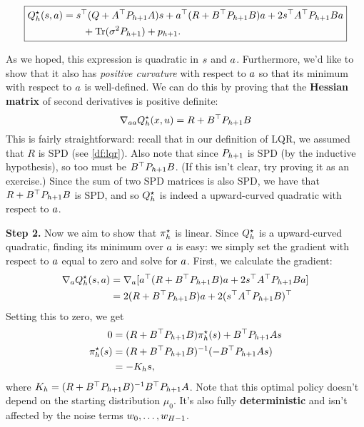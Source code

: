 \documentclass[\main/main]{subfiles}
\begin{document}
\begin{equation}
    \boxed{
        \begin{aligned}
            Q^\star_h(s, a) & = s^\top (Q + A^\top P_{h+1} A) s + a^\top (R + B^\top P_{h+1} B) a
            + 2s^\top A^\top P_{h+1} B a                                                                        \\
                                   & \qquad + \operatorname*{\textrm{Tr}}(\sigma^2 P_{h+1}) + p_{h+1}.
        \end{aligned}
    }
    \label{eq:q_star_lqr}
\end{equation}

As we hoped, this expression is quadratic in $s$ and $a$.
Furthermore, we'd like to show that it also has \emph{positive curvature} with respect to $a$ so that its minimum with respect to $a$ is well-defined.
We can do this by proving that the \textbf{Hessian matrix} of second derivatives is positive definite:
\[ \nabla_{a a} Q_h^\star(x, u) = R + B^\top P_{h+1} B \]
This is fairly straightforward:
recall that in our definition of LQR,
we assumed that $R$ is SPD (see \autoref{df:lqr}).
Also note that since $P_{h+1}$ is SPD (by the inductive hypothesis), so too must be $B^\top P_{h+1} B$. (If this isn't clear, try proving it as an exercise.)
Since the sum of two SPD matrices is also SPD, we have that $R + B^\top P_{h+1} B$ is SPD,
and so $Q^\star_h$ is indeed a upward-curved quadratic with respect to $a$.

\textbf{Step 2.} Now we aim to show that $\pi^\star_h$ is linear.
Since $Q^\star_h$ is a upward-curved quadratic, finding its minimum over $a$ is easy:
we simply set the gradient with respect to $a$ equal to zero and solve for $a$.
First, we calculate the gradient:
\begin{align*}
    \nabla_a Q^\star_h(s, a) & = \nabla_a [ a^\top (R + B^\top P_{h+1} B) a + 2 s^\top A^\top P_{h+1} B a ] \\
                                       & = 2 (R + B^\top P_{h+1} B) a + 2 (s^\top A^\top P_{h+1} B)^\top
\end{align*}
Setting this to zero, we get \begin{align}
    0                  & = (R + B^\top P_{h+1} B) \pi^\star_h(s) + B^\top P_{h+1} A s \nonumber \\
    \pi^\star_h(s) & = (R + B^\top P_{h+1} B)^{-1} (-B^\top P_{h+1} A s) \nonumber              \\
                       & = - K_h s,
\end{align}
where $K_h = (R + B^\top P_{h+1} B)^{-1} B^\top P_{h+1} A$. Note that this optimal policy doesn't depend on the starting distribution $\mu_0$. It's also fully \textbf{deterministic} and isn't affected by the noise terms $w_0, \dots, w_{H-1}$.
\end{document}
